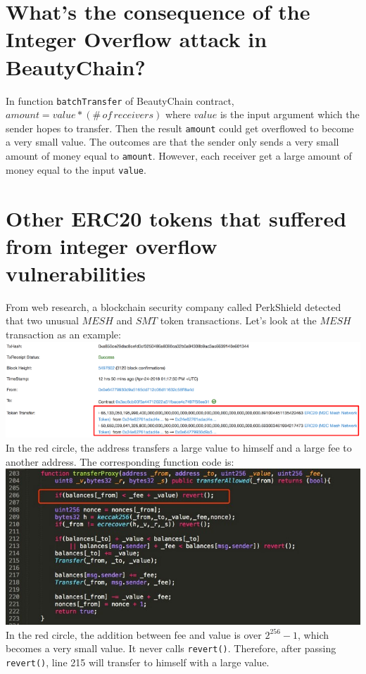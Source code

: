 \documentclass{article}
\begin{document}
\section{What’s the consequence of the Integer Overflow attack in BeautyChain?}
In function \verb|batchTransfer| of BeautyChain contract, $amount = value * (\#\,of\,receivers)$ where $value$ is the input argument which the sender hopes to transfer. Then the result \verb|amount| could get overflowed to become a very small value. The outcomes are that the sender only sends a very small amount of money equal to \verb|amount|. However, each receiver get a large amount of money equal to the input \verb|value|.
\section{Other ERC20 tokens that suffered from integer
overflow vulnerabilities}
From web research, a blockchain security company called PerkShield detected that two unusual $MESH$ and $SMT$ token transactions. Let's look at the $MESH$ transaction as an example:\\
\includegraphics[width=170mm,scale=1]{mesh.png}\\
In the red circle, the address transfers a large value to himself and a large fee to another address.
The corresponding function code is:\\
\includegraphics[width=170mm,scale=1]{meshsc.png}\\
In the red circle, the addition between fee and value is over $2^{256}-1$, which becomes a very small value. It never calls \verb|revert()|. Therefore, after passing \verb|revert()|, line 215 will transfer to himself with a large value.
\end{document}
